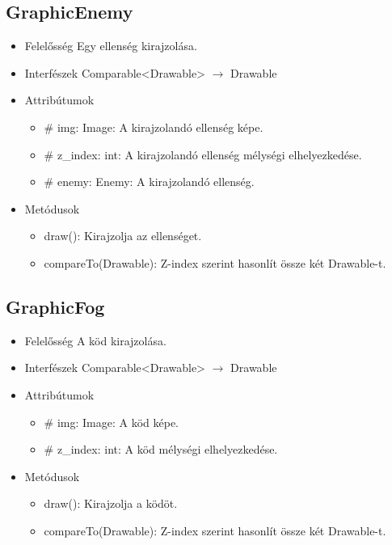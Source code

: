 \subsection{GraphicEnemy}
\begin{itemize}
\item Felelősség\newline
Egy ellenség kirajzolása.
\item Interfészek\newline
Comparable<Drawable> $\rightarrow$ Drawable
\item Attribútumok\newline
	\begin{itemize}
		\item \# img: Image: A kirajzolandó ellenség képe.
		\item \# z\_index: int: A kirajzolandó ellenség mélységi elhelyezkedése.
		\item \# enemy: Enemy: A kirajzolandó ellenség.
	\end{itemize}
\item Metódusok\newline
	\begin{itemize}
		\item draw(): Kirajzolja az ellenséget.
		\item compareTo(Drawable): Z-index szerint hasonlít össze két Drawable-t.
	\end{itemize}
\end{itemize}

\subsection{GraphicFog}
\begin{itemize}
\item Felelősség\newline
A köd kirajzolása.
\item Interfészek\newline
Comparable<Drawable> $\rightarrow$ Drawable
\item Attribútumok\newline
	\begin{itemize}
		\item \# img: Image: A köd képe.
		\item \# z\_index: int: A köd mélységi elhelyezkedése.
	\end{itemize}
\item Metódusok\newline
	\begin{itemize}
		\item draw(): Kirajzolja a ködöt.
		\item compareTo(Drawable): Z-index szerint hasonlít össze két Drawable-t.
	\end{itemize}
\end{itemize}

